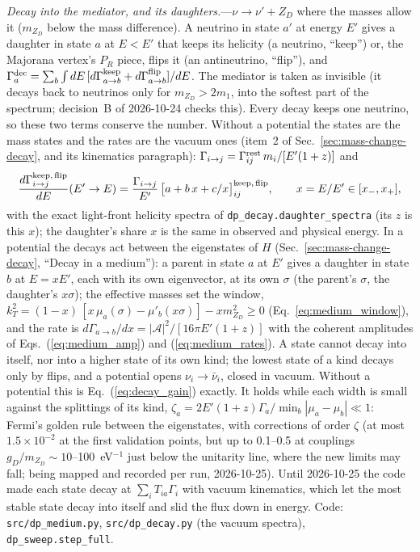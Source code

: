 \documentclass[11pt,a4paper]{article}
\newcommand{\file}[1]{\nolinkurl{#1}}
\newcommand{\mzd}{m_{Z_D}}
\newcommand{\gd}{g_D}
\begin{document}
\textit{Decay into the mediator, and its daughters.}---$\nu \to \nu' + Z_D$ where the masses allow it ($\mzd$ below the
mass difference). A neutrino in state $a'$ at energy $E'$ gives a daughter in state $a$ at $E < E'$ that keeps its
helicity (a neutrino, ``keep'') or, the Majorana vertex's $P_R$ piece, flips it (an antineutrino, ``flip''), and
$\Gamma^{\rm dec}_a = \sum_b\int dE\,[d\Gamma^{\rm keep}_{a\to b} + d\Gamma^{\rm flip}_{a\to b}]/dE$. The mediator is
taken as invisible (it decays back to neutrinos only for $\mzd > 2m_1$, into the softest part of the spectrum;
decision~B of 2026-10-24 checks this). Every decay keeps one neutrino, so these two terms conserve the number. Without a
potential the states are the mass states and the rates are the vacuum ones (item~2 of Sec.~\ref{sec:mass-change-decay},
and its kinematics paragraph): $\Gamma_{i\to j} = \Gamma^{\rm rest}_{ij}\,m_i/[E'(1+z)]$ and
\begin{equation}
\frac{d\Gamma^{\rm keep,\,flip}_{i\to j}}{dE}(E'\to E) = \frac{\Gamma_{i\to j}}{E'}\,\big[a + b\,x + c/x\big]^{\rm keep,\,flip}_{ij},
\qquad x = E/E' \in [x_-, x_+],
\label{eq:decay_gain}
\end{equation}
with the exact light-front helicity spectra of \texttt{dp\_decay.daughter\_spectra} (its $z$ is this $x$); the
daughter's share $x$ is the same in observed and physical energy. In a potential the decays act between the
eigenstates of $H$ (Sec.~\ref{sec:mass-change-decay}, ``Decay in a medium''): a parent in state $a$ at $E'$ gives a
daughter in state $b$ at $E = xE'$, each with its own eigenvector, at its own $\sigma$ (the parent's $\sigma$, the
daughter's $x\sigma$); the effective masses set the window,
$k_T^2 = (1-x)\,[x\,\mu_a(\sigma) - \mu'_b(x\sigma)] - x\mzd^2 \ge 0$ (Eq.~\ref{eq:medium_window}), and the rate is
$d\Gamma_{a\to b}/dx = |\mathcal{A}|^2/[16\pi E'(1+z)]$ with the coherent amplitudes of Eqs.~(\ref{eq:medium_amp}) and
(\ref{eq:medium_rates}). A state cannot decay into itself, nor into a higher state of its own kind; the lowest state of a
kind decays only by flips, and a potential opens $\nu_i \to \bar\nu_i$, closed in vacuum. Without a potential this is
Eq.~(\ref{eq:decay_gain}) exactly. It holds while each width is small against the splittings of its kind,
$\zeta_a = 2E'(1+z)\Gamma_a/\min_b|\mu_a - \mu_b| \ll 1$: Fermi's golden rule between the eigenstates, with corrections
of order $\zeta$ (at most $1.5\times10^{-2}$ at the first validation points, but up to 0.1--0.5 at couplings
$\gd/\mzd \sim 10$--100~eV$^{-1}$ just below the unitarity line, where the new limits may fall; being mapped and recorded
per run, 2026-10-25). Until 2026-10-25 the code made each state decay at $\sum_i T_{ia}\Gamma_i$ with vacuum kinematics,
which let the most stable state decay into itself and slid the flux down in energy. Code: \file{src/dp\_medium.py},
\file{src/dp\_decay.py} (the vacuum spectra), \texttt{dp\_sweep.step\_full}.
\end{document}
